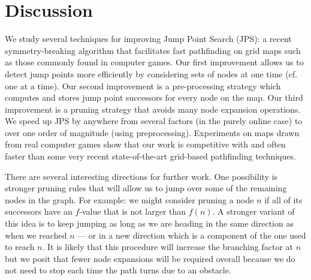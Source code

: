\section{Discussion}
\label{cha::jps2::conclusion}
We study several techniques for improving Jump Point Search (JPS):
a recent symmetry-breaking algorithm that facilitates fast pathfinding 
on grid maps such as those commonly found in computer games.
Our first improvement allows us to detect jump points 
more efficiently by considering sets of nodes at one time (cf. one at a time). 
Our second improvement is a pre-processing strategy which computes and stores jump point
successors for every node on the map. Our third improvement is a 
pruning strategy that avoids many node expansion operations.
We speed up JPS by anywhere from several factors 
(in the purely online case) to over one order of magnitude (using preprocessing).
Experiments on maps drawn from real computer games show that our 
work is competitive with and often faster than some very recent 
state-of-the-art grid-based pathfinding techniques.
%

There are several interesting directions for further work. One possibility is
stronger pruning rules that will allow us to jump over some of the remaining
nodes in the graph. For example: we might consider %
pruning a node $n$ if all of its successors have
an $f$-value that is not larger than $f(n)$. A stronger variant of this idea
is to keep jumping as long as we are heading in the same direction as when we
reached $n$ --- or in a new direction which is a component of the one used to
reach $n$. It is likely that this procedure will increase the branching factor
at $n$ but we posit that fewer node expansions will be required overall because
we do not need to stop each time the path turns due to an obstacle.


